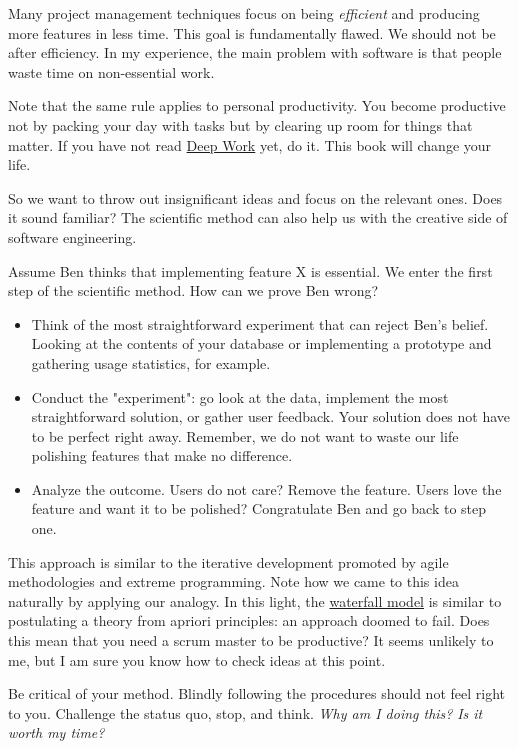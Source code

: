 \documentclass{article}
\begin{document}
Many project management techniques focus on being \emph{efficient} and producing more features in less time.
This goal is fundamentally flawed.
We should not be after efficiency.
In my experience, the main problem with software is that people waste time on non-essential work.

Note that the same rule applies to personal productivity.
You become productive not by packing your day with tasks but by clearing up room for things that matter.
If you have not read \href{https://www.amazon.com/-/en/dp/1455586692}{Deep Work} yet, do it.
This book will change your life.

So we want to throw out insignificant ideas and focus on the relevant ones.
Does it sound familiar?
The scientific method can also help us with the creative side of software engineering.

Assume Ben thinks that implementing feature X is essential.
We enter the first step of the scientific method.
How can we prove Ben wrong?
\begin{itemize}
  \item 
    Think of the most straightforward experiment that can reject Ben's belief.
    Looking at the contents of your database or implementing a prototype and gathering usage statistics, for example.
  \item 
    Conduct the "experiment": go look at the data, implement the most straightforward solution, or gather user feedback.
    Your solution does not have to be perfect right away.
    Remember, we do not want to waste our life polishing features that make no difference.
  \item 
    Analyze the outcome.
    Users do not care?
    Remove the feature.
    Users love the feature and want it to be polished?
    Congratulate Ben and go back to step one.
\end{itemize}

This approach is similar to the iterative development promoted by agile methodologies and extreme programming.
Note how we came to this idea naturally by applying our analogy.
In this light, the \href{https://en.wikipedia.org/wiki/Waterfall_model}{waterfall model} is similar to postulating a theory from apriori principles: an approach doomed to fail.
Does this mean that you need a scrum master to be productive?
It seems unlikely to me, but I am sure you know how to check ideas at this point.

Be critical of your method.
Blindly following the procedures should not feel right to you.
Challenge the status quo, stop, and think.
\emph{Why am I doing this?}
\emph{Is it worth my time?}
\end{document}

